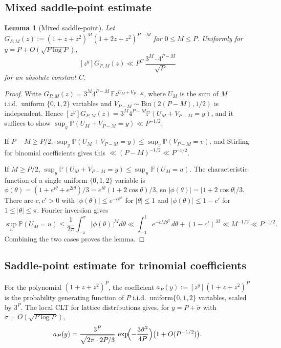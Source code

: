 \documentclass[11pt,a4paper]{amsart}
\theoremstyle{plain}
\newtheorem{lemma}[theorem]{Lemma}
\theoremstyle{definition}
\newcommand{\E}{\mathbb{E}}
\newcommand{\PP}{\mathbb{P}}
\begin{document}
\subsection{Mixed saddle-point estimate}\label{app:mixed-saddle}

\begin{lemma}[Mixed saddle-point]\label{lem:mixed-saddle-point}
Let $G_{P,M}(z):=(1+z+z^2)^M(1+2z+z^2)^{P-M}$ for $0\le M\le P$.
Uniformly for $y=P+O(\sqrt{P\log P})$,
$$
[z^y]G_{P,M}(z)\ll P^C\,\frac{3^M\cdot 4^{P-M}}{\sqrt P}
$$
for an absolute constant $C$.
\end{lemma}

\begin{proof}
Write $G_{P,M}(z)=3^M 4^{P-M}\,\E z^{U_M+V_{P-M}}$, where $U_M$ is the
sum of $M$ i.i.d.\ uniform $\{0,1,2\}$ variables and $V_{P-M}\sim\mathrm{Bin}(2(P-M),1/2)$
is independent.
Hence $[z^y]G_{P,M}(z)=3^M 4^{P-M}\PP(U_M+V_{P-M}=y)$, and it suffices to
show $\sup_y\PP(U_M+V_{P-M}=y)\ll P^{-1/2}$.

If $P-M\ge P/2$, $\sup_y\PP(U_M+V_{P-M}=y)\le\sup_v\PP(V_{P-M}=v)$, and
Stirling for binomial coefficients gives this $\ll(P-M)^{-1/2}\ll P^{-1/2}$.

If $M\ge P/2$, $\sup_y\PP(U_M+V_{P-M}=y)\le\sup_u\PP(U_M=u)$.
The characteristic function of a single uniform $\{0,1,2\}$ variable is
$\phi(\theta)=(1+e^{i\theta}+e^{2i\theta})/3=e^{i\theta}(1+2\cos\theta)/3$,
so $|\phi(\theta)|=|1+2\cos\theta|/3$.
There are $c,c'>0$ with $|\phi(\theta)|\le e^{-c\theta^2}$ for $|\theta|\le 1$
and $|\phi(\theta)|\le 1-c'$ for $1\le|\theta|\le\pi$.
Fourier inversion gives
$$
\sup_u\PP(U_M=u)
\le\frac1{2\pi}\int_{-\pi}^\pi|\phi(\theta)|^M d\theta
\ll\int_{-1}^1 e^{-cM\theta^2}\,d\theta+(1-c')^M
\ll M^{-1/2}\ll P^{-1/2}.
$$
Combining the two cases proves the lemma.
\end{proof}

\subsection{Saddle-point estimate for trinomial coefficients}
For the polynomial $(1+z+z^2)^P$, the coefficient
$a_P(y):=[z^y](1+z+z^2)^P$ is the probability generating function of
$P$ i.i.d.\ uniform$\{0,1,2\}$ variables, scaled by $3^P$.
The local CLT for lattice distributions gives, for $y=P+\tilde\sigma$ with
$\tilde\sigma=O(\sqrt{P\log P})$,
\begin{equation}\label{eq:trinomapp}
a_P(y)=\frac{3^P}{\sqrt{2\pi\cdot 2P/3}}\,\exp\!\Bigl(-\frac{3\tilde\sigma^2}{4P}\Bigr)\bigl(1+O(P^{-1/2})\bigr).
\end{equation}
\end{document}
